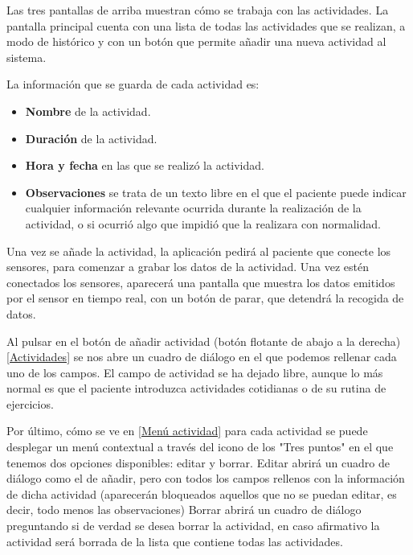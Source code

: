 \documentclass[11pt,spanish]{article}
\begin{document}
Las tres pantallas de arriba muestran cómo se trabaja con las actividades. La pantalla principal cuenta con una lista de todas las actividades que se realizan, a modo de histórico y con un botón que permite añadir una nueva actividad al sistema.
\newline

La información que se guarda de cada actividad es:

\begin{itemize}
	\item {\bf Nombre} de la actividad.
	\item {\bf Duración} de la actividad.
	\item {\bf Hora y fecha} en las que se realizó la actividad.
	\item {\bf Observaciones} se trata de un texto libre en el que el paciente puede indicar cualquier información relevante ocurrida durante la realización de la actividad, o si ocurrió algo que impidió que la realizara con normalidad.
\end{itemize}

Una vez se añade la actividad, la aplicación pedirá al paciente que conecte los sensores, para comenzar a grabar los datos de la actividad. Una vez estén conectados los sensores, aparecerá una pantalla que muestra los datos emitidos por el sensor en tiempo real, con un botón de parar, que detendrá la recogida de datos.
\newline

Al pulsar en el botón de añadir actividad (botón flotante de abajo a la derecha) \ref{Actividades} se nos abre un cuadro de diálogo en el que podemos rellenar cada uno de los campos. El campo de actividad se ha dejado libre, aunque lo más normal es que el paciente introduzca actividades cotidianas o de su rutina de ejercicios.
\newline

Por último, cómo se ve en \ref{Menú actividad} para cada actividad se puede desplegar un menú contextual a través del icono de los "Tres puntos" en el que tenemos dos opciones disponibles: editar y borrar. Editar abrirá un cuadro de diálogo como el de añadir, pero con todos los campos rellenos con la información de dicha actividad (aparecerán bloqueados aquellos que no se puedan editar, es decir, todo menos las observaciones) Borrar abrirá un cuadro de diálogo preguntando si de verdad se desea borrar la actividad, en caso afirmativo la actividad será borrada de la lista que contiene todas las actividades.
\newline
\end{document}

